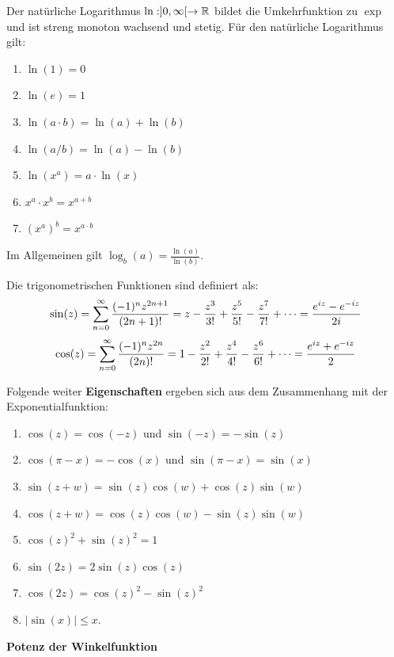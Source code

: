 Der natürliche Logarithmus $\ln : ]0, \infty[ \to \mathbb{R}$ bildet die Umkehrfunktion zu $\exp$ und ist
streng monoton wachsend und stetig. Für den natürliche Logarithmus gilt:

\begin{enumerate}[label = (\arabic*)]
	\item $\ln(1) = 0$
	\item $\ln(e) = 1$
	\item $\ln(a \cdot b) = \ln(a) + \ln(b)$
	\item $\ln(a / b) = \ln(a) - \ln(b)$
	\item $\ln(x^a) = a \cdot \ln(x)$
	\item $x^a \cdot x^b = x^{a + b}$
	\item $(x^a)^b = x^{a \cdot b}$
\end{enumerate}

Im Allgemeinen gilt $\log_b(a) = \frac{\ln(a)}{\ln(b)}$.



Die trigonometrischen Funktionen sind definiert als:
$$\sin(z) = \sum\limits_{n=0}^\infty \frac{(-1)^{n}z^{2n+1}}{(2n+1)!} = z-\frac{z^3}{3!}+\frac{z^5}{5!}-\frac{z^7}{7!}+\dots = \frac{e^{iz} - e^{-iz}}{2i}$$
$$\cos(z) = \sum\limits_{n=0}^\infty \frac{(-1)^{n}z^{2n}}{(2n)!} = 1-\frac{z^2}{2!}+\frac{z^4}{4!}-\frac{z^6}{6!}+\dots = \frac{e^{iz} + e^{-iz}}{2}$$


\vfill\null
\columnbreak


Folgende weiter \textbf{Eigenschaften} ergeben sich aus dem Zusammenhang mit der Exponentialfunktion:
\begin{enumerate}[label=(\arabic*)]
	\item $\cos(z) = \cos(-z)$ und $\sin(-z) = - \sin(z)$
	\item $\cos(\pi - x) = - \cos(x)$ und $\sin(\pi - x) = \sin(x)$
	\item $\sin(z + w) = \sin(z) \cos(w) + \cos(z) \sin(w)$
	\item $\cos(z + w) = \cos(z) \cos(w) - \sin(z) \sin(w)$
	\item $\cos(z)^2 + \sin(z)^2 = 1$
	\item $\sin(2z) = 2 \sin(z) \cos(z)$
	\item $\cos(2z) = \cos(z)^2 - \sin(z)^2$
	\item $|\sin(x)| \leq x$.
\end{enumerate}

\textbf{Potenz der Winkelfunktion}

